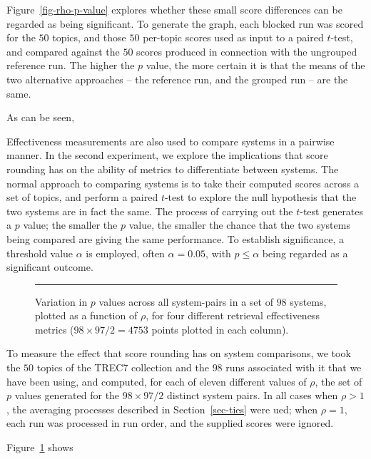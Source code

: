 Figure~\ref{fig-rho-p-value} explores whether these small score
differences can be regarded as being significant.
To generate the graph, each blocked run was scored for the $50$
topics, and those $50$ per-topic scores used as input to a paired
$t$-test, and compared against the $50$ scores produced in connection
with the ungrouped reference run.
The higher the $p$ value, the more certain it is that the means of
the two alternative approaches -- the reference run, and the grouped
run -- are the same.

As can be seen, {}

{}


Effectiveness measurements are also used to compare systems in a
pairwise manner.
In the second experiment, we explore the implications that score
rounding has on the ability of metrics to differentiate between
systems.
The normal approach to comparing systems is to take their computed
scores across a set of topics, and perform a paired $t$-test to
explore the null hypothesis that the two systems are in fact the
same.
The process of carrying out the $t$-test generates a $p$ value; the
smaller the $p$ value, the smaller the chance that the two systems
being compared are giving the same performance.
To establish significance, a threshold value $\alpha$ is employed,
often $\alpha=0.05$, with $p\le\alpha$ being regarded as a
significant outcome.

\begin{figure}[t]
\centering
\rule{0.5mm}{45mm}
\caption{Variation in $p$ values across all system-pairs in a set of
$98$ systems, plotted as a function of $\rho$, for four different
retrieval effectiveness metrics ($98\times97/2=4753$ points plotted
in each column).
\label{fig-pair-variation}}
\end{figure}

To measure the effect that score rounding has on system comparisons,
we took the $50$ topics of the TREC7 collection and the $98$ runs
associated with it that we have been using, and computed, for each of
eleven different values of $\rho$, the set of $p$ values generated
for the $98\times97/2$ distinct system pairs.
In all cases when $\rho>1$, the averaging processes described in
Section~\ref{sec-ties} were ued; when $\rho=1$, each run was
processed in run order, and the supplied scores were ignored.

Figure~\ref{fig-pair-variation} shows {}
